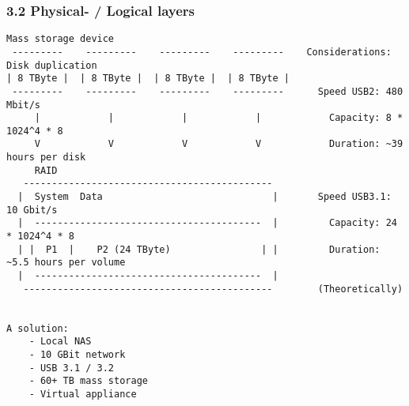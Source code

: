 \begin{frame}[fragile]
  \frametitle{3.2 Physical- / Logical layers}
  \begin{lstlisting}[basicstyle=\tiny]
	       Mass storage device
 ---------    ---------    ---------    ---------    Considerations: Disk duplication
| 8 TByte |  | 8 TByte |  | 8 TByte |  | 8 TByte |
 ---------    ---------    ---------    ---------      Speed USB2: 480 Mbit/s
     |            |            |            |            Capacity: 8 * 1024^4 * 8
     V            V            V            V            Duration: ~39 hours per disk
     RAID
   --------------------------------------------
  |  System  Data                              |       Speed USB3.1: 10 Gbit/s
  |  ----------------------------------------  |         Capacity: 24 * 1024^4 * 8
  | |  P1  |    P2 (24 TByte)                | |         Duration: ~5.5 hours per volume
  |  ----------------------------------------  |
   --------------------------------------------        (Theoretically)


A solution:
	- Local NAS
	- 10 GBit network
	- USB 3.1 / 3.2
	- 60+ TB mass storage
	- Virtual appliance
  \end{lstlisting}
\end{frame}



